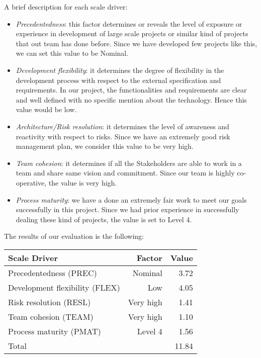 A brief description for each scale driver:
\begin{itemize}
	\item \emph{Precedentedness}: this factor determines or reveals the level of exposure or experience in development of large scale projects or similar kind of projects that out team has done before. Since we have developed few projects like this, we can set this value to be Nominal.
	\item \emph{Development flexibility}: it determines the degree of flexibility in the development process with respect to the external specification and requirements. In our project, the functionalities and requirements are clear and well defined with no specific mention about the technology. Hence this value would be low.
	\item \emph{Architecture/Risk resolution}: it determines the level of awareness and reactivity with
respect to risks. Since we have an extremely good risk management plan, we consider this value to be very high.
	\item \emph{Team cohesion}: it determines if all the Stakeholders are able to work in a team and share same vision and commitment. Since our team is highly co-operative,
	the value is very high.
	\item \emph{Process maturity}: we have a done an extremely fair work to meet our goals successfully in this project. Since we had prior experience in successfully dealing these kind of projects, the value is set to Level 4.
\end{itemize}

The results of our evaluation is the following:

\begin{table}[H]
	\centering
	\begin{tabular}{|l|r|r|}
		\hline
		Scale Driver & Factor & Value \\
		\hline
		Precedentedness (PREC) & Nominal & 3.72 \\
		Development flexibility (FLEX) & Low & 4.05 \\
		Risk resolution (RESL) & Very high & 1.41 \\
		Team cohesion (TEAM) & Very high & 1.10 \\
		Process maturity (PMAT) & Level 4 & 1.56 \\
		\hline
		\multicolumn{2}{|l|}{Total} & 11.84 \\
		\hline	
	\end{tabular}
\end{table}

